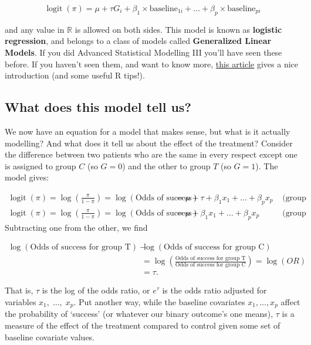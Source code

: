 \documentclass[
  openany]{book}
\theoremstyle{definition}
\theoremstyle{definition}
\theoremstyle{definition}
\theoremstyle{definition}
\theoremstyle{remark}
\begin{document}
\begin{equation}
\operatorname{logit}\left(\pi\right) = \mu + \tau G_i + \beta_1\times{\text{baseline}_{1i}} + \ldots + \beta_p\times{\text{baseline}_{pi}}
\label{eq:logreg1}
\end{equation}

and any value in \(\mathbb{R}\) is allowed on both sides. This model is known as \textbf{logistic regression}, and belongs to a class of models called \textbf{Generalized Linear Models}. If you did Advanced Statistical Modelling III you'll have seen these before. If you haven't seen them, and want to know more, \href{https://www.r-bloggers.com/2015/08/generalised-linear-models-in-r/}{this article} gives a nice introduction (and some useful R tips!).

\hypertarget{what-does-this-model-tell-us}{%
\subsection{What does this model tell us?}\label{what-does-this-model-tell-us}}

We now have an equation for a model that makes sense, but what is it actually modelling? And what does it tell us about the effect of the treatment?
Consider the difference between two patients who are the same in every respect except one is assigned to group \(C\) (so \(G=0\)) and the other to group \(T\) (so \(G=1\)). The model gives:

\[
\begin{aligned}
\operatorname{logit}\left(\pi\right) = \log\left(\frac{\pi}{1-\pi}\right) = \log\left(\text{Odds of success}\right) & = \mu + \tau + \beta_1x_1 + \ldots + \beta_px_p & \text{ (group T)}\\
\operatorname{logit}\left(\pi\right) = \log\left(\frac{\pi}{1-\pi}\right) = \log\left(\text{Odds of success}\right) & = \mu + \beta_1x_1 + \ldots + \beta_px_p & \text{ (group C)}
\end{aligned}
\]
Subtracting one from the other, we find

\[
\begin{aligned}
\log(\text{Odds of success for group T}) - & \log(\text{Odds of success for group C})\\
&= 
\log\left(\frac{\text{Odds of success for group T}}{\text{Odds of success for group C}}\right) = \log\left(OR\right) \\
&= \tau.
\end{aligned}
\]

That is, \(\tau\) is the log of the odds ratio, or \(e^\tau\) is the odds ratio adjusted for variables \(x_1,\;\ldots,\;x_p\). Put another way, while the baseline covariates \(x_1,\ldots,x_p\) affect the probability of `success' (or whatever our binary outcome's one means), \(\tau\) is a measure of the effect of the treatment compared to control given some set of baseline covariate values.
\end{document}
